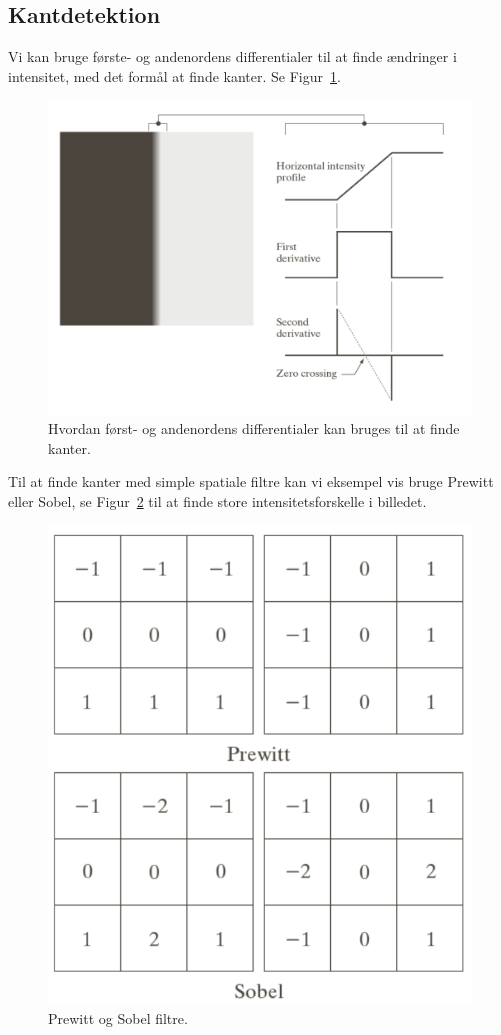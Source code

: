 \subsection{Kantdetektion}

Vi kan bruge første- og andenordens differentialer til at finde ændringer i intensitet, med det formål at finde kanter. Se Figur~\ref{fig:differential-edge-detection}. 

\begin{figure}[H]
	\centering
	\includegraphics[width=0.8\linewidth]{figs/spm03/differential-edge-detection}
	\caption{Hvordan først- og andenordens differentialer kan bruges til at finde kanter.}
	\label{fig:differential-edge-detection}
\end{figure}

Til at finde kanter med simple spatiale filtre kan vi eksempel vis bruge Prewitt eller Sobel, se Figur~\ref{fig:gradient-filters} til at finde store intensitetsforskelle i billedet.

\begin{figure}[H]
	\centering
	\includegraphics[width=0.5\linewidth]{figs/spm03/gradient-filters}
	\caption{Prewitt og Sobel filtre.}
	\label{fig:gradient-filters}
\end{figure}

